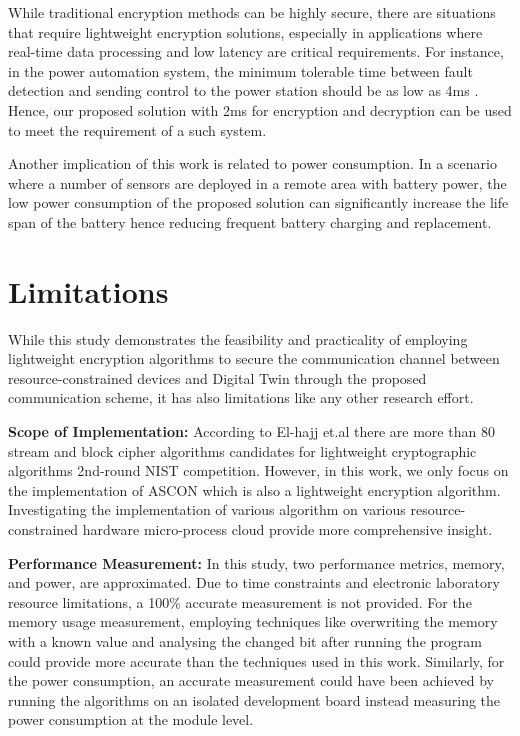 

While traditional encryption methods can be highly secure, there are situations that require lightweight encryption solutions, especially in applications where real-time data processing and low latency are critical requirements. For instance, in the power automation system, the minimum tolerable time between fault detection and sending control to the power station should be as low as 4ms \cite{rajkumar_cyber_2020}. Hence, our proposed solution with 2ms for encryption and decryption can be used to meet the requirement of a such system. 

Another implication of this work is related to power consumption. In a scenario where a number of sensors are deployed in a remote area with battery power, the low power consumption of the proposed solution can significantly increase the life span of the battery hence reducing frequent battery charging and replacement. 

\section{Limitations}
While this study demonstrates the feasibility and practicality of employing lightweight encryption algorithms to secure the communication channel between resource-constrained devices and Digital Twin through the proposed communication scheme, it has also limitations like any other research effort.

\textbf{{Scope of Implementation:}} According to El-hajj et.al \cite{el-hajj_analysis_2023} there are more than 80 stream and block cipher algorithms candidates for lightweight cryptographic algorithms 2nd-round NIST competition. However, in this work, we only focus on the implementation of ASCON which is also a lightweight encryption algorithm. Investigating the implementation of various algorithm on various resource-constrained hardware micro-process cloud provide more comprehensive insight. 

\textbf{Performance Measurement:} In this study, two performance metrics, memory, and power, are approximated. Due to time constraints and electronic laboratory resource limitations, a 100\% accurate measurement is not provided. For the memory usage measurement, employing techniques like overwriting the memory with a known value and analysing the changed bit after running the program could provide more accurate than the techniques used in this work. Similarly, for the power consumption, an accurate measurement could have been achieved by running the algorithms on an isolated development board instead measuring the power consumption at the module level. 


